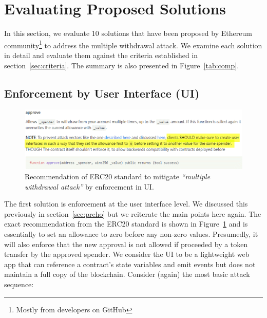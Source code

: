 
\section{Evaluating Proposed Solutions}\label{sec:eval}

In this section, we evaluate 10 solutions that have been proposed by Ethereum community\footnote{Mostly from developers on GitHub} to address the multiple withdrawal attack. We examine each solution in detail and evaluate them against the criteria established in section~\ref{sec:criteria}. The summary is also presented in Figure~\ref{tab:comp}.


\subsection{Enforcement by User Interface (UI)}\label{sec:enfui}

\begin{figure}[t!]
	\centering
	\includegraphics[width=1.0\linewidth]{figures/multiple_withdrawal_03.png}
	\caption{Recommendation of ERC20 standard to mitigate \textit{``multiple withdrawal attack''} by enforcement in UI.\label{fig:uie}}
\end{figure}

The first solution is enforcement at the user interface level. We discussed this previously in section~\ref{sec:preho} but we reiterate the main points here again. The exact recommendation from the ERC20 standard is shown in Figure~\ref{fig:uie} and is essentially to set an allowance to zero before any non-zero values. Presumedly, it will also enforce that the new approval is not allowed if proceeded by a token transfer by the approved spender. We consider the UI to be a lightweight web app that can reference a contract's state variables and emit events but does not maintain a full copy of the blockchain. Consider (again) the most basic attack sequence:


